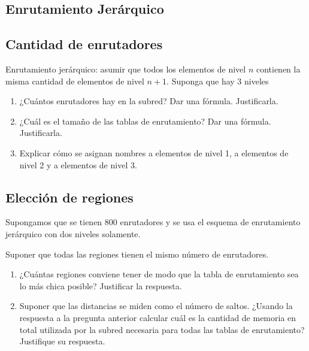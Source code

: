 \documentclass[12pt]{report}
\begin{document}
\begin{exer}
	\section{Enrutamiento Jerárquico}
	\subsection{Cantidad de enrutadores \sthree}
	Enrutamiento jerárquico: asumir que todos los elementos de nivel $n$ contienen la misma
	cantidad de elementos de nivel $n+1$. Suponga que hay 3 niveles

	\begin{enumerate}
		\item ¿Cuántos enrutadores hay en la subred? Dar una fórmula. Justificarla.
		\item ¿Cuál es el tamaño de las tablas de enrutamiento? Dar una fórmula. Justificarla.
		\item Explicar cómo se asignan nombres a elementos de nivel 1, a elementos de nivel 2 y a elementos de nivel 3.
	\end{enumerate}
\end{exer}

\begin{exer}
	\subsection{Elección de regiones \stwo \shard}
	Supongamos que se tienen 800 enrutadores y se usa el esquema de enrutamiento jerárquico con dos niveles solamente.

	Suponer que todas las regiones tienen el mismo número de enrutadores.

	\begin{enumerate}
		\item ¿Cuántas regiones conviene tener de modo que la tabla de enrutamiento sea lo más chica posible? Justificar la respuesta.
		      \subitem {}
		      \subitem {}
		      \subitem {}
		\item Suponer que las distancias se miden como el número de saltos. ¿Usando la
		      respuesta a la pregunta anterior calcular cuál es la cantidad de memoria en total
		      utilizada por la subred necesaria para todas las tablas de enrutamiento?
		      Justifique su respuesta.
	\end{enumerate}
\end{exer}
\end{document}
